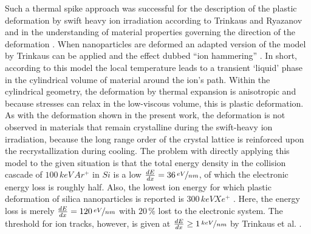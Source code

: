 \begin{Figure}[h]
Such a thermal spike approach was successful for the description of the plastic deformation by swift heavy ion irradiation according to Trinkaus and Ryazanov \cite{trinkaus_viscoelastic_1995} and in the understanding of material properties governing the direction of the deformation \cite{hedler_amorphous_2004,hedler_boundary_2005}. When nanoparticles are deformed \cite{snoeks_colloidal_2000,snoeks_colloidal_2001,van_dillen_anisotropic_2001,dillen_energy-dependent_2001,dillen_ion_2003,dillen_ion_2004} an adapted version of the model by Trinkaus can be applied and the effect dubbed ``ion hammering'' \cite{klaumunzer_ion_2004}. In short, according to this model the local temperature leads to a transient `liquid' phase in the cylindrical volume of material around the ion's path. Within the cylindrical geometry, the deformation by thermal expansion is anisotropic and because stresses can relax in the low-viscous volume, this is plastic deformation. As with the deformation shown in the present work, the deformation is not observed in materials that remain crystalline during the swift-heavy ion irradiation, because the long range order of the crystal lattice is reinforced upon the recrystallization during cooling. The problem with directly applying this model to the given situation is that the total energy density in the collision cascade of $100\,keV\,Ar^+$ in $Si$ is a low $\frac{dE}{dx} = 36\,\nicefrac{eV}{nm}$, of which the electronic energy loss is roughly half. Also, the lowest ion energy for which plastic deformation of silica nanoparticles is reported is $300\,keV Xe^+$ \cite{dillen_ion_2003}. Here, the energy loss is merely $\frac{dE}{dx} = 120\,\nicefrac{eV}{nm}$ with $20\,\%$ lost to the electronic system. The threshold for ion tracks, however, is given at $\frac{dE}{dx} \geq 1\,\nicefrac{keV}{nm}$ by Trinkaus et al. \cite{trinkaus_viscoelastic_1995}.


\end{Figure}
